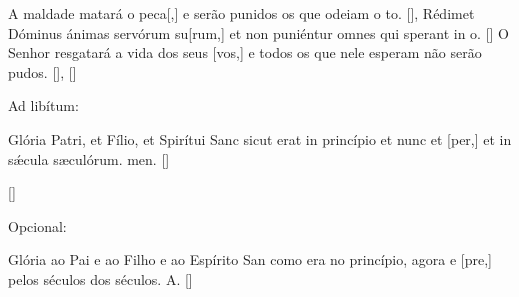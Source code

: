 {    {A maldade matará o peca[,] e serão punidos os que odeiam o to. [\LinkPT]},
  {Rédimet Dóminus ánimas servórum su[rum,] et non puniéntur omnes qui sperant in o. [\LinkLA]}%
    {O Senhor resgatará a vida dos seus [vos,] e todos os que nele esperam não serão pudos. [\LinkPT]},
  []{\begin{rubrica}Ad libítum:\end{rubrica} Glória Patri, et Fílio, et Spirítui Sanc sicut erat in princípio et nunc et [per,] et in sǽcula sæculórum. men. [\LinkLA]}%
    []{\begin{rubrica}Opcional:\end{rubrica} Glória ao Pai e ao Filho e ao Espírito San como era no princípio, agora e [pre,] pelos séculos dos séculos. A. [\LinkPT]}
}